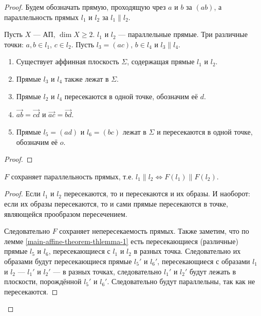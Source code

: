 \documentclass[12pt,a4paper]{article}
\begin{document}
    \begin{proof}
        Будем обозначать прямую, проходящую чрез $a$ и $b$ за $(ab)$, а параллельность прямых $l_1$ и $l_2$ за $l_1 \parallel l_2$.

        \begin{thlemma}\label{main-affine-theorem-thlemma-1}
            Пусть $X$ --- АП, $\dim X \geqslant 2$. $l_1$ и $l_2$ --- параллельные прямые. Три различные точки: $a, b \in l_1$, $c \in l_2$. Пусть $l_3 = (ac)$, $b \in l_4$ и $l_3 \parallel l_4$.
            \begin{enumerate}
                \item Существует аффинная плоскость $\Sigma$, содержащая прямые $l_1$ и $l_2$.
                \item Прямые $l_3$ и $l_4$ также лежат в $\Sigma$.
                \item Прямые $l_2$ и $l_4$ пересекаются в одной точке, обозначим её $d$.
                \item $\overrightarrow{ab} = \overrightarrow{cd}$ и $\overrightarrow{ac} = \overrightarrow{bd}$.
                \item Прямые $l_5 = (ad)$ и $l_6 = (bc)$ лежат в $\Sigma$ и пересекаются в одной точке, обозначим её $o$.
            \end{enumerate}
        \end{thlemma}

        \begin{proof}
        \end{proof}

        \begin{thlemma}
            $F$ сохраняет параллельность прямых, т.е. $l_1 \parallel l_2 \Leftrightarrow F(l_1) \parallel F(l_2)$.
        \end{thlemma}

        \begin{proof}
            Если $l_1$ и $l_2$ пересекаются, то и пересекаются и их образы. И наоборот: если их образы пересекаются, то и сами прямые пересекаются в точке, являющейся прообразом пересечением.

            Следовательно $F$ сохраняет непересекаемость прямых. Также заметим, что по лемме \ref{main-affine-theorem-thlemma-1} есть пересекающиеся (различные) прямые $l_5$ и $l_6$, пересекающиеся с $l_1$ и $l_2$ в разных точка. Следовательно их образами будут пересекающиеся прямые $l_5'$ и $l_6'$, пересекающиеся с образами $l_1$ и $l_2$ --- $l_1'$ и $l_2'$ --- в разных точках, следовательно $l_1'$ и $l_2'$ будут лежать в плоскости, порождённой $l_5'$ и $l_6'$. Следовательно будут параллельны, так как не пересекаются.
        \end{proof}


\end{proof}
\end{document}
